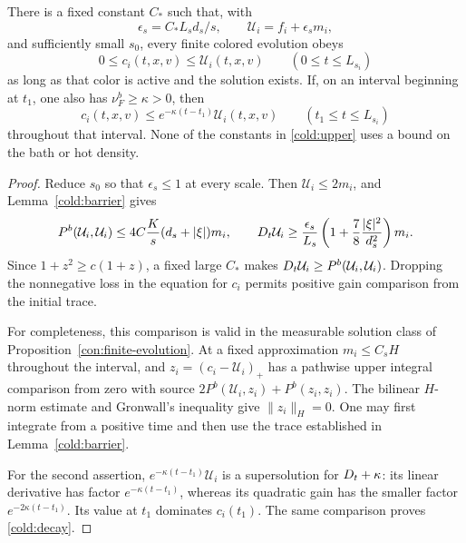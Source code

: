 \begin{proposition}\label{cold:control}
There is a fixed constant \(C_*\) such that, with
\[
 \epsilon_s=C_*L_sd_s/s,\qquad
 \mathcal U_i=f_i+\epsilon_s m_i,
\]
and sufficiently small \(s_0\), every finite colored evolution obeys
\begin{equation}
 0\le c_i(t,x,v)\le\mathcal U_i(t,x,v)\qquad (0\le t\le L_{s_i})
 \label{cold:upper}
\end{equation}
as long as that color is active and the solution exists.
If, on an interval beginning at \(t_1\), one also has
\(\nu_F^b\ge\kappa>0\), then
\begin{equation}
 c_i(t,x,v)\le e^{-\kappa(t-t_1)}\mathcal U_i(t,x,v)\qquad
                   (t_1\le t\le L_{s_i})
 \label{cold:decay}
\end{equation}
throughout that interval.  None of the constants in
\eqref{cold:upper} uses a bound on the bath or hot density.
\end{proposition}
\begin{proof}
Reduce \(s_0\) so that \(\epsilon_s\le1\) at every scale.  Then
\(\mathcal U_i\le2m_i\), and Lemma~\ref{cold:barrier} gives
\[
 P^b(\mathcal U_i,\mathcal U_i)
 \le4C\frac K{s}(d_s+|\xi|)m_i,\qquad
 D_t\mathcal U_i\ge\frac{\epsilon_s}{L_s}
          \left(1+\frac78\frac{|\xi|^2}{d_s^2}\right)m_i.
\]
Since \(1+z^2\ge c(1+z)\), a fixed large \(C_*\) makes
\(D_t\mathcal U_i\ge P^b(\mathcal U_i,\mathcal U_i)\).
Dropping the nonnegative loss in the equation for \(c_i\) permits
positive gain comparison from the initial trace.

For completeness, this comparison is valid in the measurable solution
class of Proposition~\ref{con:finite-evolution}.  At a fixed
approximation \(m_i\le C_sH\) throughout the interval, and
\(z_i=(c_i-\mathcal U_i)_+\) has a pathwise upper integral comparison
from zero with source
\(2P^b(\mathcal U_i,z_i)+P^b(z_i,z_i)\).
The bilinear \(H\)-norm estimate and Gronwall's inequality give
\(\|z_i\|_H=0\).  One may first integrate from a positive time and
then use the trace established in Lemma~\ref{cold:barrier}.

For the second assertion,
\(e^{-\kappa(t-t_1)}\mathcal U_i\) is a supersolution for
\(D_t+\kappa\): its linear derivative has factor
\(e^{-\kappa(t-t_1)}\), whereas its quadratic gain has the smaller
factor \(e^{-2\kappa(t-t_1)}\).  Its value at \(t_1\) dominates
\(c_i(t_1)\).  The same comparison proves \eqref{cold:decay}.
\end{proof}

